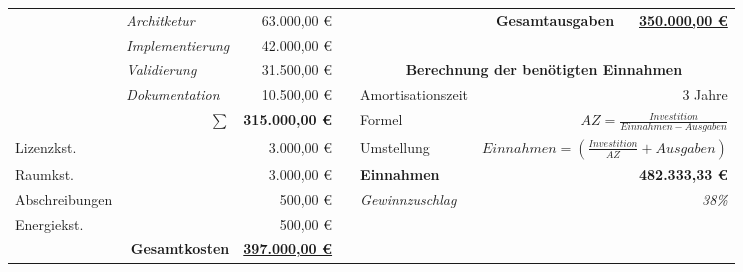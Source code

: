 \begin{sidewaystable}
\begin{tabular}{|llr|lllr}
                      & \multicolumn{1}{l|}{\textit{Architketur}}       & 63.000,00 \euro                 & \multicolumn{1}{l|}{} &                          & \multicolumn{1}{r|}{\textbf{Gesamtausgaben}} & \multicolumn{1}{r|}{{\ul \textbf{350.000,00 \euro}}} \\ \cline{5-7} 
                      & \multicolumn{1}{l|}{\textit{Implementierung}}   & 42.000,00 \euro                 &                       &                          &                                              & \multicolumn{1}{l}{}                             \\ \cline{5-7} 
                      & \multicolumn{1}{l|}{\textit{Validierung}}       & 31.500,00 \euro                 & \multicolumn{1}{l|}{} & \multicolumn{3}{c|}{\textbf{Berechnung der benötigten Einnahmen}}                                                          \\ \cline{5-7} 
                      & \multicolumn{1}{l|}{\textit{Dokumentation}}     & 10.500,00 \euro                 & \multicolumn{1}{l|}{} & Amortisationszeit        & \multicolumn{1}{r}{}                         & \multicolumn{1}{r|}{3 Jahre}                     \\
                      & \multicolumn{1}{r|}{$\sum$}                          & \textbf{315.000,00 \euro}       & \multicolumn{1}{l|}{} & Formel                   & \multicolumn{2}{r|}{$AZ = \frac{Investition}{Einnahmen-Ausgaben}$}                                                                          \\
Lizenzkst.            & \multicolumn{1}{l|}{}                           & 3.000,00 \euro                  & \multicolumn{1}{l|}{} & Umstellung               & \multicolumn{2}{r|}{$Einnahmen = (\frac{Investition}{AZ} + Ausgaben)$}                                                                          \\
Raumkst.              & \multicolumn{1}{l|}{}                           & 3.000,00 \euro                  & \multicolumn{1}{l|}{} & \textbf{Einnahmen}       & \textbf{}                                    & \multicolumn{1}{r|}{\textbf{482.333,33 \euro}}       \\
Abschreibungen        & \multicolumn{1}{l|}{}                           & 500,00 \euro                    & \multicolumn{1}{l|}{} & \textit{Gewinnzuschlag}  &                                              & \multicolumn{1}{r|}{\textit{38\%}}               \\ \cline{5-7} 
Energiekst.           & \multicolumn{1}{l|}{}                           & 500,00 \euro                    &                       &                          &                                              & \multicolumn{1}{l}{}                             \\ \cline{1-3}
                      & \multicolumn{1}{r|}{\textbf{Gesamtkosten}}      & {\ul \textbf{397.000,00 \euro}} &                       &                          &                                              & \multicolumn{1}{l}{}                             \\ \cline{1-3}
\end{tabular}
\end{sidewaystable} 